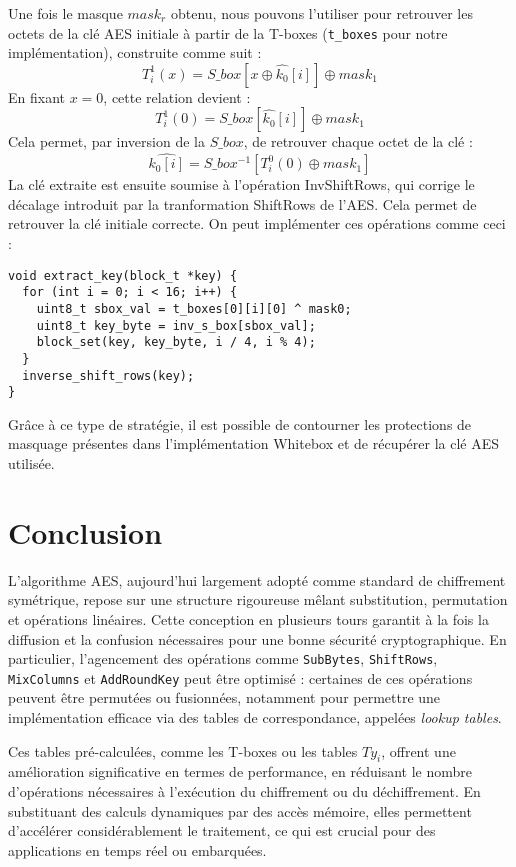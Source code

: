 \documentclass[a4paper, 10pt]{article}
\begin{document}
\normalsize
Une fois le masque $mask_{r}$ obtenu, nous pouvons l'utiliser pour retrouver les octets de la clé AES initiale à partir de la T-boxes 
(\texttt{t\_boxes} pour notre implémentation), construite comme suit :
\[
  T_{i}^{1}(x) = S\_box[x \oplus \hat{k_{0}}[i]] \oplus mask_{1}
\]
En fixant $x = 0$, cette relation devient :
\[
  T_{i}^{1}(0) = S\_box[\hat{k_{0}}[i]] \oplus mask_{1}
\]
Cela permet, par inversion de la $S\_box$, de retrouver chaque octet de la clé :
\[
\hat{k_{0}[i]} = S\_box^{-1}[T_{i}^{0}(0) \oplus mask_{1}]
\]
La clé extraite est ensuite soumise à l'opération InvShiftRows, qui corrige le décalage introduit par la tranformation ShiftRows 
de l'AES. Cela permet de retrouver la clé initiale correcte. On peut implémenter ces opérations comme ceci :
\small{
  \begin{verbatim}
void extract_key(block_t *key) {
  for (int i = 0; i < 16; i++) {
    uint8_t sbox_val = t_boxes[0][i][0] ^ mask0;
    uint8_t key_byte = inv_s_box[sbox_val];
    block_set(key, key_byte, i / 4, i % 4);
  }
  inverse_shift_rows(key);
}
  \end{verbatim}
}
\normalsize
Grâce à ce type de stratégie, il est possible de contourner les protections de masquage présentes dans l’implémentation Whitebox et de récupérer la clé AES utilisée.

\section{Conclusion}
L'algorithme AES, aujourd’hui largement adopté comme standard de chiffrement symétrique, repose sur une structure rigoureuse mêlant substitution, permutation et opérations linéaires. Cette conception en plusieurs tours garantit à la fois la diffusion et la confusion nécessaires pour une bonne sécurité cryptographique. En particulier, l’agencement des opérations comme \texttt{SubBytes}, \texttt{ShiftRows}, \texttt{MixColumns} et \texttt{AddRoundKey} peut être optimisé : certaines de ces opérations peuvent être permutées ou fusionnées, notamment pour permettre une implémentation efficace via des tables de correspondance, appelées \textit{lookup tables}.

Ces tables pré-calculées, comme les T-boxes ou les tables \(Ty_{i}\), offrent une amélioration significative en termes de performance, en réduisant le nombre d’opérations nécessaires à l’exécution du chiffrement ou du déchiffrement. En substituant des calculs dynamiques par des accès mémoire, elles permettent d’accélérer considérablement le traitement, ce qui est crucial pour des applications en temps réel ou embarquées.
\end{document}
